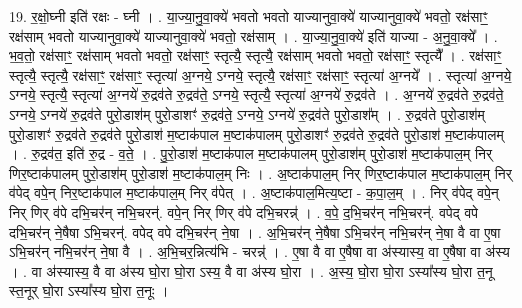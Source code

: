 \documentclass[17pt]{extarticle}
\begin{document}
19. र॒क्षो॒घ्नी इति॑ रक्षः - घ्नी । . या॒ज्या॒नु॒वा॒क्ये॑ भवतो भवतो याज्यानुवा॒क्ये॑ याज्यानुवा॒क्ये॑ भवतो॒ रक्ष॑साꣳ॒॒ रक्ष॑साम् भवतो याज्यानुवा॒क्ये॑ याज्यानुवा॒क्ये॑ भवतो॒ रक्ष॑साम् । . या॒ज्या॒नु॒वा॒क्ये॑ इति॑ याज्या - अ॒नु॒वा॒क्ये᳚ । . भ॒व॒तो॒ रक्ष॑साꣳ॒॒ रक्ष॑साम् भवतो भवतो॒ रक्ष॑साꣳ॒॒ स्तृत्यै॒ स्तृत्यै॒ रक्ष॑साम् भवतो भवतो॒ रक्ष॑साꣳ॒॒ स्तृत्यै᳚ । . रक्ष॑साꣳ॒॒ स्तृत्यै॒ स्तृत्यै॒ रक्ष॑साꣳ॒॒ रक्ष॑साꣳ॒॒ स्तृत्या॑ अ॒ग्नये॒ ऽग्नये॒ स्तृत्यै॒ रक्ष॑साꣳ॒॒ रक्ष॑साꣳ॒॒ स्तृत्या॑ अ॒ग्नये᳚ । . स्तृत्या॑ अ॒ग्नये॒ ऽग्नये॒ स्तृत्यै॒ स्तृत्या॑ अ॒ग्नये॑ रु॒द्रव॑ते रु॒द्रव॑ते॒ ऽग्नये॒ स्तृत्यै॒ स्तृत्या॑ अ॒ग्नये॑ रु॒द्रव॑ते । . अ॒ग्नये॑ रु॒द्रव॑ते रु॒द्रव॑ते॒ ऽग्नये॒ ऽग्नये॑ रु॒द्रव॑ते पुरो॒डाश॑म् पुरो॒डाशꣳ॑ रु॒द्रव॑ते॒ ऽग्नये॒ ऽग्नये॑ रु॒द्रव॑ते पुरो॒डाश᳚म् । . रु॒द्रव॑ते पुरो॒डाश॑म् पुरो॒डाशꣳ॑ रु॒द्रव॑ते रु॒द्रव॑ते पुरो॒डाश॑ म॒ष्टाक॑पाल म॒ष्टाक॑पालम् पुरो॒डाशꣳ॑ रु॒द्रव॑ते रु॒द्रव॑ते पुरो॒डाश॑ म॒ष्टाक॑पालम् । . रु॒द्रव॑त॒ इति॑ रु॒द्र - व॒ते॒ । . पु॒रो॒डाश॑ म॒ष्टाक॑पाल म॒ष्टाक॑पालम् पुरो॒डाश॑म् पुरो॒डाश॑ म॒ष्टाक॑पाल॒म् निर् णिर॒ष्टाक॑पालम् पुरो॒डाश॑म् पुरो॒डाश॑ म॒ष्टाक॑पाल॒म् निः । . अ॒ष्टाक॑पाल॒म् निर् णिर॒ष्टाक॑पाल म॒ष्टाक॑पाल॒म् निर् व॑पेद् वपे॒न् निर॒ष्टाक॑पाल म॒ष्टाक॑पाल॒म् निर् व॑पेत् । . अ॒ष्टाक॑पाल॒मित्य॒ष्टा - क॒पा॒ल॒म् । . निर् व॑पेद् वपे॒न् निर् णिर् व॑पे दभि॒चर॑न् नभि॒चरन्॑. वपे॒न् निर् णिर् व॑पे दभि॒चरन्न्॑ । . व॒पे॒ द॒भि॒चर॑न् नभि॒चरन्॑. वपेद् वपे दभि॒चर॑न् ने॒षैषा ऽभि॒चरन्॑. वपेद् वपे दभि॒चर॑न् ने॒षा । . अ॒भि॒चर॑न् ने॒षैषा ऽभि॒चर॑न् नभि॒चर॑न् ने॒षा वै वा ए॒षा ऽभि॒चर॑न् नभि॒चर॑न् ने॒षा वै । . अ॒भि॒चर॒न्नित्य॑भि - चरन्न्॑ । . ए॒षा वै वा ए॒षैषा वा अ॑स्यास्य॒ वा ए॒षैषा वा अ॑स्य । . वा अ॑स्यास्य॒ वै वा अ॑स्य घो॒रा घो॒रा ऽस्य॒ वै वा अ॑स्य घो॒रा । . अ॒स्य॒ घो॒रा घो॒रा ऽस्या᳚स्य घो॒रा त॒नू स्त॒नूर् घो॒रा ऽस्या᳚स्य घो॒रा त॒नूः । \newline
\end{document}

